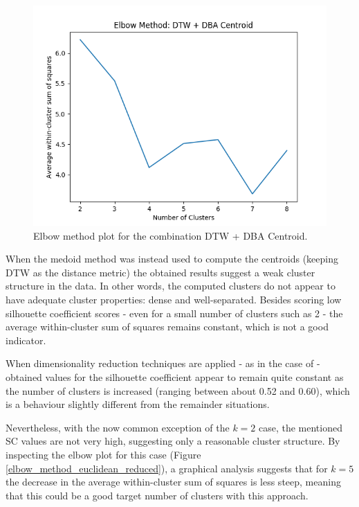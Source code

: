 \documentclass[9pt,journal,compsoc]{IEEEtran}
\begin{document}
\begin{figure}[ht]
	\centering
	\includegraphics[scale=0.5]{images/raw_dtw_DBA.png}
	\caption{Elbow method plot for the combination DTW + DBA Centroid.}
	\label{elbow_method_dba}
\end{figure}

When the medoid method was instead used to compute the centroids (keeping DTW as the distance metric) the obtained results suggest a weak cluster structure in the data. In other words, the computed clusters do not appear to have adequate cluster properties: dense and well-separated. Besides scoring low silhouette coefficient scores - even for a small number of clusters such as 2 - the average within-cluster sum of squares remains constant, which is not a good indicator.

When dimensionality reduction techniques are applied - as in the case of \cite{abreu2012using} - obtained values for the silhouette coefficient appear to remain quite constant as the number of clusters is increased (ranging between about 0.52 and 0.60), which is a behaviour slightly different from the remainder situations.

Nevertheless, with the now common exception of the $k=2$ case, the mentioned SC values are not very high, suggesting only a reasonable cluster structure. By inspecting the elbow plot for this case (Figure \ref{elbow_method_euclidean_reduced}), a graphical analysis suggests that for $k = 5$ the decrease in the average within-cluster sum of squares is less steep, meaning that this could be a good target number of clusters with this approach.
\end{document}
